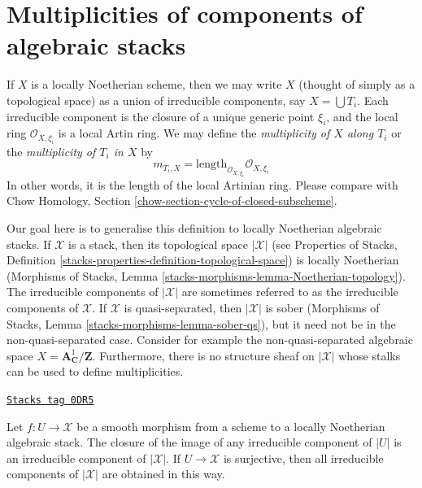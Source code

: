 \section{Multiplicities of components of algebraic stacks}
\label{stacks-geometry-section-multiplicities}
If $X$ is a locally Noetherian scheme, then we may write $X$ (thought
of simply as a topological space) as a union of irreducible components,
say $X = \bigcup T_i$.  Each irreducible component is the closure of a
unique generic point $\xi_i$, and the local ring $\mathcal O_{X,\xi_i}$
is a local Artin ring. We may define the {\it multiplicity of $X$ along $T_i$}
or the {\it multiplicity of $T_i$ in $X$} by
$$
m_{T_i, X} = \text{length}_{\mathcal O_{X, \xi_i}} \mathcal O_{X, \xi_i}
$$
In other words, it is the length of the local Artinian ring. Please
compare with
Chow Homology, Section \ref{chow-section-cycle-of-closed-subscheme}.

\medskip\noindent
Our goal here is to generalise this definition to locally
Noetherian algebraic stacks. If $\mathcal{X}$ is a stack,
then its topological space $|\mathcal{X}|$
(see Properties of Stacks, Definition
\ref{stacks-properties-definition-topological-space})
is locally Noetherian
(Morphisms of Stacks, Lemma \ref{stacks-morphisms-lemma-Noetherian-topology}).
The irreducible components of $|\mathcal{X}|$ are sometimes
referred to as the irreducible components of $\mathcal{X}$.
If $\mathcal{X}$ is quasi-separated, then $|\mathcal{X}|$
is sober (Morphisms of Stacks, Lemma
\ref{stacks-morphisms-lemma-sober-qs}),
but it need not be in the
non-quasi-separated case. Consider for example the non-quasi-separated
algebraic space $X = \mathbf{A}^1_\mathbf{C}/\mathbf{Z}$.
Furthermore, there is no structure sheaf
on $|\mathcal{X}|$ whose stalks can be used to define multiplicities.

\begin{lemma}
\label{stacks-geometry-lemma-map-of-components}
\href{https://stacks.math.columbia.edu/tag/0DR5}{\texttt{Stacks tag 0DR5}}

Let $f : U \to \mathcal{X}$ be a smooth morphism from a scheme
to a locally Noetherian algebraic stack. The closure of the image of any
irreducible component of $|U|$ is an irreducible component of $|\mathcal{X}|$.
If $U \to \mathcal{X}$ is surjective, then all irreducible components of
$|\mathcal{X}|$ are obtained in this way.
\end{lemma}

